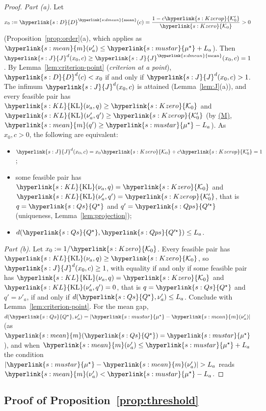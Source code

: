 \documentclass[11pt]{article}
\newcommand{\sy}[2]{{\hyperlink{#1}{#2}}}
\newcommand{\term}[2]{\hyperlink{#1}{#2}}
\newcommand{\mean}{\sy{s:mean}{m}}
\newcommand{\KL}{\sy{s:KL}{\mathrm{KL}}}
\newcommand{\dmean}{\sy{s:dmean}{\mathrm{mean}}}
\newcommand{\propM}{\term{s:M}{(M)}}
\newcommand{\mus}{\sy{s:mustar}{\mu^{\star}}}
\newcommand{\Jf}{\sy{s:J}{J}}
\newcommand{\Dc}{\sy{s:D}{D}}
\newcommand{\Ko}{\sy{s:Kzero}{\mathcal{K}_{0}}}
\newcommand{\Kop}{\sy{s:Kzerop}{\mathcal{K}'_{0}}}
\newcommand{\Qs}{\sy{s:Qs}{Q^{\star}}}
\newcommand{\Qps}{\sy{s:Qps}{Q'^{\star}}}
\begin{document}
\begin{proof}
\emph{Part (a).} Let
\begin{equation*}
x_0:=\Dc^{\dmean}(c)=\frac{1-c\Kop}{\Ko}>0
\end{equation*}
(Proposition~\ref{prop:order}(a), which applies as $\mean(\nu'_a)\le\mus+L_a$). Then
$\Jf^d(x_0,c)\ge \Jf^{\dmean}(x_0,c)=1$. By Lemma~\ref{lem:criterion-point} (\emph{criterion at a
point}), $\Dc^d(c)<x_0$ if and only if $\Jf^d(x_0,c)>1$. The infimum $\Jf^d(x_0,c)$ is attained
(Lemma~\ref{lem:J}(a)), and every feasible pair has $\KL(\nu_a,q)\ge\Ko$ and $\KL(\nu'_a,q')\ge\Kop$
(by \propM{}, $\mean(q')\ge\mus-L_a$). As $x_0,c>0$, the following are equivalent:
\begin{itemize}
\item $\Jf^d(x_0,c)=x_0\Ko+c\Kop=1$;
\item some feasible pair has $\KL(\nu_a,q)=\Ko$ and $\KL(\nu'_a,q')=\Kop$, that is $q=\Qs$ and
  $q'=\Qps$ (uniqueness, Lemma~\ref{lem:projection});
\item $d(\Qs,\Qps)\le L_a$.
\end{itemize}

\emph{Part (b).} Let $x_0:=1/\Ko$. Every feasible pair has $\KL(\nu_a,q)\ge\Ko$, so
$\Jf^d(x_0,c)\ge1$, with equality if and only if some feasible pair has $\KL(\nu_a,q)=\Ko$ and
$\KL(\nu'_a,q')=0$, that is $q=\Qs$ and $q'=\nu'_a$, if and only if $d(\Qs,\nu'_a)\le L_a$. Conclude
with Lemma~\ref{lem:criterion-point}. For the mean gap, $d(\Qs,\nu'_a)=|\mus-\mean(\nu'_a)|$ (as
$\mean(\Qs)=\mus$), and when $\mean(\nu'_a)\le\mus+L_a$ the condition
$|\mus-\mean(\nu'_a)|>L_a$ reads $\mean(\nu'_a)<\mus-L_a$.
\end{proof}

\subsection{Proof of Proposition~\ref{prop:threshold}}\label{sec:proof-prop-threshold}
\end{document}
